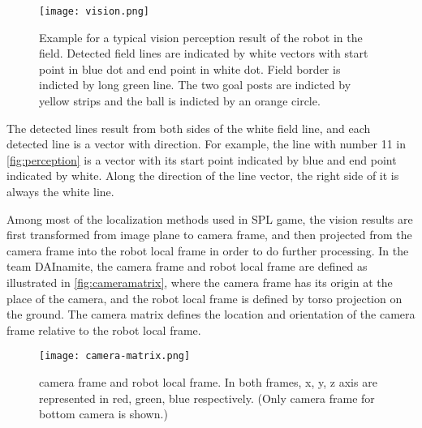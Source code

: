 \begin{figure}[h!]
  \centering
  \texttt{[image: vision.png]}
  \caption[Example for a typical vision perception result of the robot in the field.]{Example for a typical vision perception result of the robot in the field. Detected field lines are indicated by white vectors with start point in blue dot and end point in white dot. Field border is indicted by long green line. The two goal posts are indicted by yellow strips and the ball is indicted by an orange circle.}
  \label{fig:perception}
\end{figure}

The detected lines result from both sides of the white field line, and each detected line is a vector with direction. For example, the line with number 11 in \autoref{fig:perception} is a vector with its start point indicated by blue and end point indicated by white. Along the direction of the line vector, the right side of it is always the white line.

Among most of the localization methods used in \gls{SPL} game, the vision results are first transformed from image plane to camera frame, and then projected from the camera frame into the robot local frame in order to do further processing. In the team DAInamite, the camera frame and robot local frame are defined as illustrated in \autoref{fig:cameramatrix}, where the camera frame has its origin at the place of the camera, and the robot local frame is defined by torso projection on the ground. The camera matrix defines the location and orientation of the camera frame relative to the robot local frame.
\begin{figure}[h!]
  \centering
  \texttt{[image: camera-matrix.png]}
  \caption[Only camera frame for bottom camera is shown]{camera frame and robot local frame. In both frames, x, y, z axis are represented in red, green, blue respectively. (Only camera frame for bottom camera is shown.)}
  \label{fig:cameramatrix}
\end{figure}

